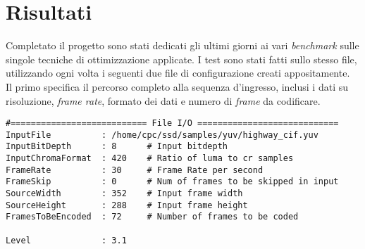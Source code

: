 
\chapter{Risultati} %

\label{Chapter7} %


Completato il progetto sono stati dedicati gli ultimi giorni ai vari 
\emph{benchmark} sulle singole tecniche di ottimizzazione applicate. 
I test sono stati fatti sullo stesso file, utilizzando ogni volta i seguenti 
due file di configurazione creati appositamente.\\

Il primo specifica il percorso completo alla sequenza d'ingresso, inclusi 
i dati su risoluzione, \emph{frame rate}, formato dei dati e numero di 
\emph{frame} da codificare.

\begin{lstlisting}
#=========================== File I/O ============================
InputFile          : /home/cpc/ssd/samples/yuv/highway_cif.yuv
InputBitDepth      : 8      # Input bitdepth
InputChromaFormat  : 420    # Ratio of luma to cr samples
FrameRate          : 30     # Frame Rate per second
FrameSkip          : 0      # Num of frames to be skipped in input
SourceWidth        : 352    # Input frame width
SourceHeight       : 288    # Input frame height
FramesToBeEncoded  : 72     # Number of frames to be coded
 
Level              : 3.1
\end{lstlisting}

